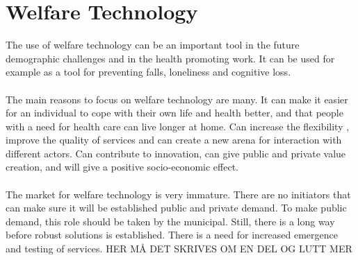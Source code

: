 \section{Welfare Technology}
The use of welfare technology can be an important tool in the future demographic challenges and in the health promoting work. It can be used for example as a tool for preventing falls, loneliness and cognitive loss. \\ \\
The main reasons to focus on welfare technology are many. It can make it easier for an individual to cope with their own life and health better, and that people with a need for health care can live longer at home. Can increase the flexibility , improve the quality of services and can create a new arena for interaction with different actors. Can contribute to innovation, can give public and private value creation, and will give a positive socio-economic effect. \\ \\
The market for welfare technology is very immature. There are no initiators that can make sure it will be established public and private demand. To make public demand, this role should be taken by the municipal. Still, there is a long way before robust solutions is established. There is a need for increased emergence and testing of services. \cite{welfare} HER MÅ DET SKRIVES OM EN DEL OG LUTT MER

